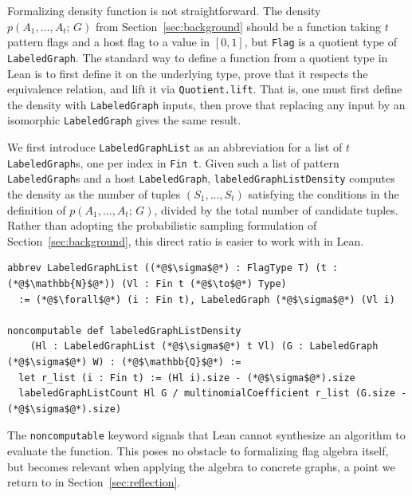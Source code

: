 \documentclass{article}
\newcommand{\den}[2]{p(#1;\,#2)}
\newcommand{\lean}[1]{\texttt{#1}}
\begin{document}
Formalizing density function is not straightforward.  The density
$\den{A_1,\ldots,A_t}{G}$ from Section~\ref{sec:background} should be a
function taking $t$ pattern flags and a host flag to a value in $[0,1]$, but
\lean{Flag} is a quotient type of \lean{LabeledGraph}.  The standard way to
define a function from a quotient type in Lean is to first define it on the
underlying type, prove that it respects the equivalence relation, and lift it
via \lean{Quotient.lift}.  That is, one must first define the density with
\lean{LabeledGraph} inputs, then prove that replacing any input by an
isomorphic \lean{LabeledGraph} gives the same result.

We first introduce \lean{LabeledGraphList} as an abbreviation for a
list of $t$ \lean{LabeledGraph}s, one per index in \lean{Fin t}.
Given such a list of pattern \lean{LabeledGraph}s and a host \lean{LabeledGraph},
\lean{labeledGraphListDensity} computes the density as the number of tuples
$(S_1, \ldots, S_t)$ satisfying the conditions in the definition of $\den{A_1,\ldots,A_t}{G}$,
divided by the total number of candidate tuples.  Rather than adopting the
probabilistic sampling formulation of Section~\ref{sec:background}, this direct ratio is easier to work with in Lean.
\begin{lstlisting}
abbrev LabeledGraphList ((*@$\sigma$@*) : FlagType T) (t : (*@$\mathbb{N}$@*)) (Vl : Fin t (*@$\to$@*) Type)
  := (*@$\forall$@*) (i : Fin t), LabeledGraph (*@$\sigma$@*) (Vl i)

noncomputable def labeledGraphListDensity
    (Hl : LabeledGraphList (*@$\sigma$@*) t Vl) (G : LabeledGraph (*@$\sigma$@*) W) : (*@$\mathbb{Q}$@*) :=
  let r_list (i : Fin t) := (Hl i).size - (*@$\sigma$@*).size
  labeledGraphListCount Hl G / multinomialCoefficient r_list (G.size - (*@$\sigma$@*).size)
\end{lstlisting}
The \lean{noncomputable} keyword signals that Lean cannot synthesize an algorithm
to evaluate the function.  This poses no obstacle to formalizing flag algebra
itself, but becomes relevant when applying the algebra to concrete graphs, a
point we return to in Section~\ref{sec:reflection}.
\end{document}

